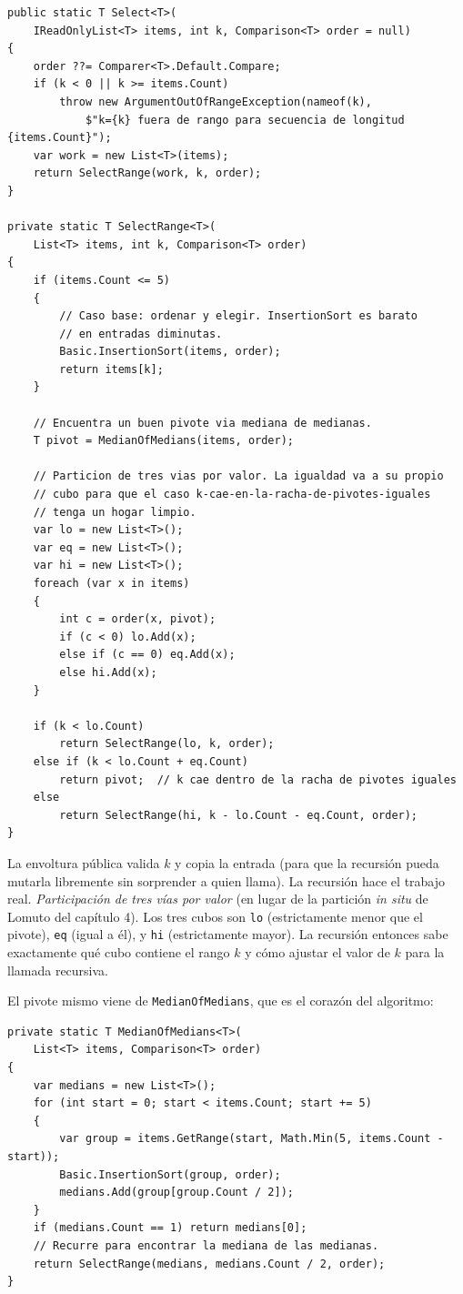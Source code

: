 \documentclass[11pt,a4paper]{article}
\begin{document}
\begin{lstlisting}[caption={Selección determinista en $O(n)$ en el peor caso}]
public static T Select<T>(
    IReadOnlyList<T> items, int k, Comparison<T> order = null)
{
    order ??= Comparer<T>.Default.Compare;
    if (k < 0 || k >= items.Count)
        throw new ArgumentOutOfRangeException(nameof(k),
            $"k={k} fuera de rango para secuencia de longitud {items.Count}");
    var work = new List<T>(items);
    return SelectRange(work, k, order);
}

private static T SelectRange<T>(
    List<T> items, int k, Comparison<T> order)
{
    if (items.Count <= 5)
    {
        // Caso base: ordenar y elegir. InsertionSort es barato
        // en entradas diminutas.
        Basic.InsertionSort(items, order);
        return items[k];
    }

    // Encuentra un buen pivote via mediana de medianas.
    T pivot = MedianOfMedians(items, order);

    // Particion de tres vias por valor. La igualdad va a su propio
    // cubo para que el caso k-cae-en-la-racha-de-pivotes-iguales
    // tenga un hogar limpio.
    var lo = new List<T>();
    var eq = new List<T>();
    var hi = new List<T>();
    foreach (var x in items)
    {
        int c = order(x, pivot);
        if (c < 0) lo.Add(x);
        else if (c == 0) eq.Add(x);
        else hi.Add(x);
    }

    if (k < lo.Count)
        return SelectRange(lo, k, order);
    else if (k < lo.Count + eq.Count)
        return pivot;  // k cae dentro de la racha de pivotes iguales
    else
        return SelectRange(hi, k - lo.Count - eq.Count, order);
}
\end{lstlisting}

La envoltura pública valida $k$ y copia la entrada (para que la recursión pueda mutarla libremente sin sorprender a quien llama). La recursión hace el trabajo real. \emph{Participación de tres vías por valor} (en lugar de la partición \emph{in situ} de Lomuto del capítulo 4). Los tres cubos son \texttt{lo} (estrictamente menor que el pivote), \texttt{eq} (igual a él), y \texttt{hi} (estrictamente mayor). La recursión entonces sabe exactamente qué cubo contiene el rango $k$ y cómo ajustar el valor de $k$ para la llamada recursiva.

El pivote mismo viene de \texttt{MedianOfMedians}, que es el corazón del algoritmo:

\begin{lstlisting}[caption={\texttt{MedianOfMedians}: el corazón de BFPRT}]
private static T MedianOfMedians<T>(
    List<T> items, Comparison<T> order)
{
    var medians = new List<T>();
    for (int start = 0; start < items.Count; start += 5)
    {
        var group = items.GetRange(start, Math.Min(5, items.Count - start));
        Basic.InsertionSort(group, order);
        medians.Add(group[group.Count / 2]);
    }
    if (medians.Count == 1) return medians[0];
    // Recurre para encontrar la mediana de las medianas.
    return SelectRange(medians, medians.Count / 2, order);
}
\end{lstlisting}
\end{document}
